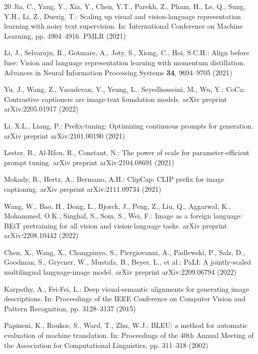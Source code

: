 \documentclass[runningheads]{llncs}
\begin{document}
\begin{thebibliography}{20}
Jia, C., Yang, Y., Xia, Y., Chen, Y.T., Parekh, Z., Pham, H., Le, Q., Sung, Y.H., Li, Z., Duerig, T.: Scaling up visual and vision-language representation learning with noisy text supervision. In: International Conference on Machine Learning, pp. 4904--4916. PMLR (2021)

Li, J., Selvaraju, R., Gotmare, A., Joty, S., Xiong, C., Hoi, S.C.H.: Align before fuse: Vision and language representation learning with momentum distillation. Advances in Neural Information Processing Systems \textbf{34}, 9694--9705 (2021)

Yu, J., Wang, Z., Vasudevan, V., Yeung, L., Seyedhosseini, M., Wu, Y.: CoCa: Contrastive captioners are image-text foundation models. arXiv preprint arXiv:2205.01917 (2022)

Li, X.L., Liang, P.: Prefix-tuning: Optimizing continuous prompts for generation. arXiv preprint arXiv:2101.00190 (2021)

Lester, B., Al-Rfou, R., Constant, N.: The power of scale for parameter-efficient prompt tuning. arXiv preprint arXiv:2104.08691 (2021)

Mokady, R., Hertz, A., Bermano, A.H.: ClipCap: CLIP prefix for image captioning. arXiv preprint arXiv:2111.09734 (2021)

Wang, W., Bao, H., Dong, L., Bjorck, J., Peng, Z., Liu, Q., Aggarwal, K., Mohammed, O.K., Singhal, S., Som, S., Wei, F.: Image as a foreign language: BEiT pretraining for all vision and vision-language tasks. arXiv preprint arXiv:2208.10442 (2022)

Chen, X., Wang, X., Changpinyo, S., Piergiovanni, A., Padlewski, P., Salz, D., Goodman, S., Grycner, W., Mustafa, B., Beyer, L., et al.: PaLI: A jointly-scaled multilingual language-image model. arXiv preprint arXiv:2209.06794 (2022)

Karpathy, A., Fei-Fei, L.: Deep visual-semantic alignments for generating image descriptions. In: Proceedings of the IEEE Conference on Computer Vision and Pattern Recognition, pp. 3128--3137 (2015)

Papineni, K., Roukos, S., Ward, T., Zhu, W.J.: BLEU: a method for automatic evaluation of machine translation. In: Proceedings of the 40th Annual Meeting of the Association for Computational Linguistics, pp. 311--318 (2002)


\end{thebibliography}
\end{document}

